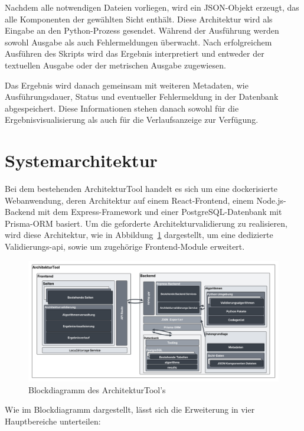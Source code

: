 Nachdem alle notwendigen Dateien vorliegen, wird ein JSON-Objekt erzeugt, das alle Komponenten der gewählten Sicht enthält. Diese Architektur wird als Eingabe an den Python-Prozess gesendet. Während der Ausführung werden sowohl Ausgabe als auch Fehlermeldungen überwacht. Nach erfolgreichem Ausführen des Skripts wird das Ergebnis interpretiert und entweder der textuellen Ausgabe oder der metrischen Ausgabe zugewiesen.

Das Ergebnis wird danach gemeinsam mit weiteren Metadaten, wie Ausführungsdauer, Status und eventueller Fehlermeldung in der Datenbank abgespeichert. Diese Informationen stehen danach sowohl für die Ergebnisvisualisierung als auch für die Verlaufsanzeige zur Verfügung.

\section{Systemarchitektur}
\label{sec:sysarchitektur}

Bei dem bestehenden ArchitekturTool handelt es sich um eine dockerisierte Webanwendung, deren Architektur auf einem React-Frontend, einem Node.js-Backend mit dem Express-Framework und einer PostgreSQL-Datenbank mit Prisma-ORM basiert. Um die geforderte Architekturvalidierung zu realisieren, wird diese Architektur, wie in Abbildung~\ref{fig:blockdiagram} dargestellt, um eine dedizierte Validierungs-\gls{api}, sowie um zugehörige Frontend-Module erweitert.


\begin{figure}[h!]
  \centering
  \includegraphics[width=\textwidth]{figures/04Konzeption/Blockdiagram.png}
  \caption{Blockdiagramm des ArchitekturTool's}
  \label{fig:blockdiagram}
\end{figure}


Wie im Blockdiagramm dargestellt, lässt sich die Erweiterung in vier Hauptbereiche unterteilen:

